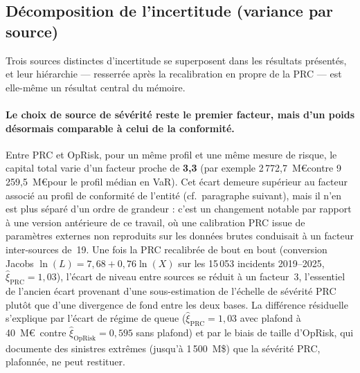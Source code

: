 \documentclass[11pt,a4paper]{article}
\theoremstyle{navystyle}
\theoremstyle{navydef}
\begin{document}
\subsection{Décomposition de l'incertitude (variance par source)}

Trois sources distinctes d'incertitude se superposent dans les résultats
présentés, et leur hiérarchie --- resserrée après la recalibration en propre
de la PRC --- est elle-même un résultat central du mémoire.

\paragraph{Le choix de source de sévérité reste le premier facteur, mais d'un
poids désormais comparable à celui de la conformité.} Entre PRC et OpRisk,
pour un même profil et une même mesure de risque, le capital total varie d'un
facteur proche de \textbf{3{,}3} (par exemple 2\,772{,}7~M\euro contre
9\,259{,}5~M\euro pour le profil médian en VaR). Cet écart demeure supérieur
au facteur associé au profil de conformité de l'entité (cf.\ paragraphe
suivant), mais il n'en est plus séparé d'un ordre de grandeur : c'est un
changement notable par rapport à une version antérieure de ce travail, où une
calibration PRC issue de paramètres externes non reproduits sur les données
brutes conduisait à un facteur inter-sources de~19. Une fois la PRC
recalibrée de bout en bout (conversion Jacobs $\ln(L)=7{,}68+0{,}76\ln(X)$ sur
les 15\,053 incidents 2019--2025, $\hat\xi_{\text{PRC}}=1{,}03$), l'écart de
niveau entre sources se réduit à un facteur~3, l'essentiel de l'ancien écart
provenant d'une sous-estimation de l'échelle de sévérité PRC plutôt que d'une
divergence de fond entre les deux bases. La différence résiduelle
s'explique par l'écart de régime de queue ($\hat{\xi}_{\text{PRC}} = 1{,}03$
avec plafond à 40~M\euro\ contre $\hat{\xi}_{\text{OpRisk}} = 0{,}595$ sans
plafond) et par le biais de taille d'OpRisk, qui documente des sinistres
extrêmes (jusqu'à 1\,500~M\$) que la sévérité PRC, plafonnée, ne peut
restituer.
\end{document}

